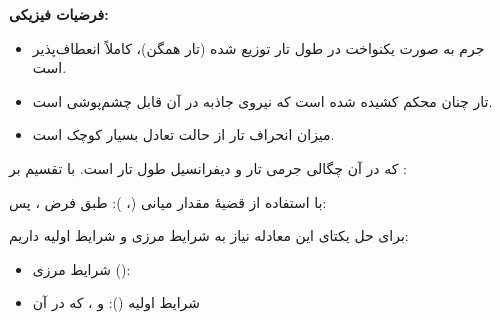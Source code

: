 \textbf{فرضیات فیزیکی:}

\begin{itemize}
\tightlist
\item
  جرم به صورت یکنواخت در طول تار توزیع شده (تار همگن)، کاملاً انعطاف‌پذیر است.
\item
  تار چنان محکم کشیده شده است که نیروی جاذبه در آن قابل چشم‌پوشی است.
\item
  میزان انحراف تار از حالت تعادل بسیار کوچک است.
\end{itemize}


که در آن \EMim{\rho} چگالی جرمی تار و  دیفرانسیل طول تار است. با تقسیم بر :

با استفاده از قضیهٔ مقدار میانی (، ):
طبق فرض ، پس:

برای حل یکتای این معادله نیاز به شرایط مرزی و شرایط اولیه داریم:

\begin{itemize}
\tightlist
\item
  شرایط مرزی (): 
\item
  شرایط اولیه ():  و ، که در آن 
\end{itemize}

